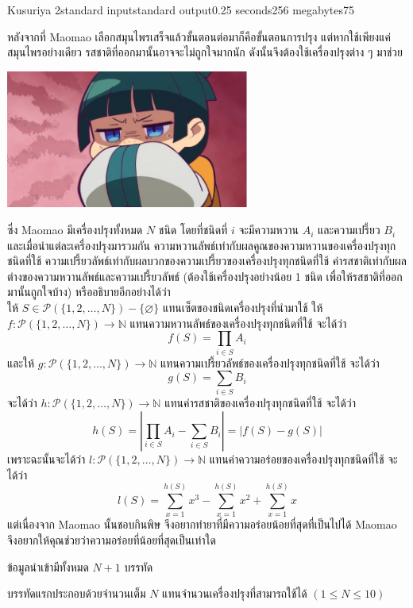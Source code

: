 \documentclass[11pt,a4paper]{article}
\begin{document}
\begin{problem}{Kusuriya 2}{standard input}{standard output}{0.25 seconds}{256 megabytes}{75}

หลังจากที่ Maomao เลือกสมุนไพรเสร็จแล้วขั้นตอนต่อมาก็คือขั้นตอนการปรุง แต่หากใช้เพียงแค่สมุนไพรอย่างเดียว รสชาติที่ออกมานั้นอาจจะไม่ถูกใจมากนัก ดังนั้นจึงต้องใช้เครื่องปรุงต่าง ๆ มาช่วย

\begin{center}
    \includegraphics[width=8cm]{kusuriya2/image0.jpg}
\end{center}

ซึ่ง Maomao มีเครื่องปรุงทั้งหมด $N$ ชนิด โดยที่ชนิดที่ $i$ จะมีความหวาน $A_i$ และความเปรี้ยว $B_i$ และเมื่อนำแต่ละเครื่องปรุงมารวมกัน ความหวานลัพธ์เท่ากับผลคูณของความหวานของเครื่องปรุงทุกชนิดที่ใช้ ความเปรี้ยวลัพธ์เท่ากับผลบวกของความเปรี้ยวของเครื่องปรุงทุกชนิดที่ใช้ ค่ารสชาติเท่ากับผลต่างของความหวานลัพธ์และความเปรี้ยวลัพธ์ (ต้องใช้เครื่องปรุงอย่างน้อย 1 ชนิด เพื่อให้รสชาติที่ออกมานั้นถูกใจบ้าง) หรืออธิบายอีกอย่างได้ว่า \\
ให้ $S\in\mathcal{P}(\{1,2,\ldots,N\})-\{\varnothing\}$ แทนเซ็ตของชนิดเครื่องปรุงที่นำมาใช้ ให้ $f:\mathcal{P}(\{1,2,\ldots,N\})\to\mathbb{N}$ แทนความหวานลัพธ์ของเครื่องปรุงทุกชนิดที่ใช้ จะได้ว่า \[f(S)=\prod\limits_{i\in S}A_i\] 
และให้ $g:\mathcal{P}(\{1,2,\ldots,N\})\to\mathbb{N}$ แทนความเปรี้ยวลัพธ์ของเครื่องปรุงทุกชนิดที่ใช้ จะได้ว่า \[g(S)=\sum\limits_{i\in S}B_i\]
จะได้ว่า $h:\mathcal{P}(\{1,2,\ldots,N\})\to\mathbb{N}$ แทนค่ารสชาติของเครื่องปรุงทุกชนิดที่ใช้ จะได้ว่า \[h(S)=\left|\prod\limits_{i\in S}A_i-\sum\limits_{i\in S}B_i\right|=\left|f(S)-g(S)\right|\]
เพราะฉะนั้นจะได้ว่า $l:\mathcal{P}(\{1,2,\ldots,N\})\to\mathbb{N}$ แทนค่าความอร่อยของเครื่องปรุงทุกชนิดที่ใช้ จะได้ว่า \[l(S)=\sum\limits_{x=1}^{h(S)}x^3-\sum\limits_{x=1}^{h(S)}x^2+\sum\limits_{x=1}^{h(S)}x\]
แต่เนื่องจาก Maomao นั้นชอบกินพิษ จึงอยากทำยาที่มีความอร่อยน้อยที่สุดที่เป็นไปได้ Maomao จึงอยากให้คุณช่วยว่าความอร่อยที่น้อยที่สุดเป็นเท่าใด

\InputFile
ข้อมูลนำเข้ามีทั้งหมด $N+1$ บรรทัด

บรรทัดแรกประกอบด้วยจำนวนเต็ม $N$ แทนจำนวนเครื่องปรุงที่สามารถใช้ได้ $(1\leq N\leq 10)$


\end{problem}
\end{document}
